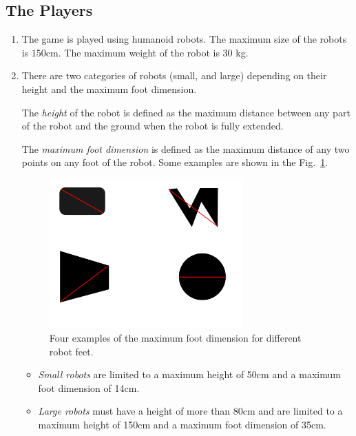 \documentclass[12pt]{article}
\newcounter{law}[section]
\newcommand{\law}[2][Law]{ %
  \refstepcounter{law} %
  \renewcommand\thesubsection{#1-\arabic{law}} %
  \subsection{\hfill #2} %
}
\newenvironment{lawlist}[1][Law]{ %
  \begin{enumerate} %
    \renewcommand{\theenumi}{#1-\arabic{law}.\arabic{enumi}}} %
  {\end{enumerate}}
\begin{document}
\law{The Players}
\label{law:players}

\begin{lawlist}
\item \label{humanoid} The game is played using humanoid robots. The
  maximum size of the robots is 150cm. The maximum weight of the robot
  is 30 kg.
\item \label{categories} There are two categories of robots (small,
and large) depending on their height and the maximum foot
dimension. 

The \emph{height} of the robot is defined as the maximum distance
between any part of the robot and the ground when the robot is fully
extended.

The \emph{maximum foot dimension} is defined as the maximum
distance of any two points on any foot of the robot. Some
examples are shown in the Fig.~\ref{fig:foot-dimension}.

  \begin{figure}
    \begin{center}
      \includegraphics[width=0.7\textwidth]{Figures/foot-dimension}
    \end{center}
    \caption{Four examples of the maximum foot dimension for different
     robot feet.}
    \label{fig:foot-dimension}
  \end{figure}

  \begin{itemize}
    \item \emph{Small robots} are limited to a maximum height of 50cm
       and a maximum foot dimension of 14cm.
    \item \emph{Large robots} must have a height of more than 80cm and
    are limited to a maximum height of 150cm and a maximum foot
    dimension of 35cm.  
  \end{itemize}


\end{lawlist}
\end{document}
